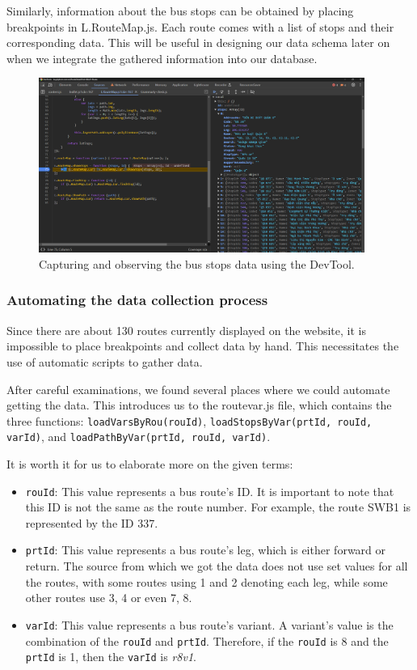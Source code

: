 Similarly, information about the bus stops can be obtained by placing breakpoints in L.RouteMap.js. Each route comes with a list of stops and their corresponding data. This will be useful in designing our data schema later on when we integrate the gathered information into our database.

\begin{figure}[H]
    \centering
    \includegraphics[width=0.95\textwidth]{assets/images/Research/Bus/stop_web.png}
    \caption{Capturing and observing the bus stops data using the DevTool.}
    \label{fig:stop_data}
\end{figure}

\subsubsection{Automating the data collection process}

Since there are about 130 routes currently displayed on the website, it is impossible to place breakpoints and collect data by hand. This necessitates the use of automatic scripts to gather data.

After careful examinations, we found several places where we could automate getting the data. This introduces us to the routevar.js file, which contains the three functions: \lstinline{loadVarsByRou(rouId)}, \lstinline{loadStopsByVar(prtId, rouId, varId)}, and \lstinline{loadPathByVar(prtId, rouId, varId)}.

It is worth it for us to elaborate more on the given terms:
\begin{itemize}
    \item \lstinline{rouId}: This value represents a bus route's ID. It is important to note that this ID is not the same as the route number. For example, the route SWB1 is represented by the ID 337. 
    \item \lstinline{prtId}: This value represents a bus route's leg, which is either forward or return. The source from which we got the data does not use set values for all the routes, with some routes using 1 and 2 denoting each leg, while some other routes use 3, 4 or even 7, 8. 
    \item \lstinline{varId}: This value represents a bus route's variant. A variant's value is the combination of the \lstinline{rouId} and \lstinline{prtId}. Therefore, if the \lstinline{rouId} is 8 and the \lstinline{prtId} is 1, then the \lstinline{varId} is \textit{r8v1}.
\end{itemize}

